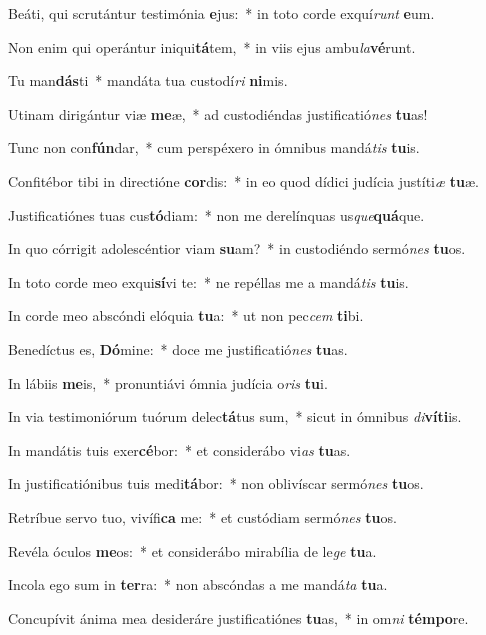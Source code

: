 \item Beáti, qui scrutántur testimónia \textbf{e}jus:~* in toto corde exquí\textit{runt} \textbf{e}um.
\item Non enim qui operántur iniqui\textbf{tá}tem,~* in viis ejus ambu\textit{la}\textbf{vé}runt.
\item Tu man\textbf{dás}ti~* mandáta tua custodí\textit{ri} \textbf{ni}mis.
\item Utinam dirigántur viæ \textbf{me}æ,~* ad custodiéndas justificatió\textit{nes} \textbf{tu}as!
\item Tunc non con\textbf{fún}dar,~* cum perspéxero in ómnibus mandá\textit{tis} \textbf{tu}is.
\item Confitébor tibi in directióne \textbf{cor}dis:~* in eo quod dídici judícia justíti\textit{æ} \textbf{tu}æ.
\item Justificatiónes tuas cus\textbf{tó}diam:~* non me derelínquas us\textit{que}\textbf{quá}que.
\item In quo córrigit adolescéntior viam \textbf{su}am?~* in custodiéndo sermó\textit{nes} \textbf{tu}os.
\item In toto corde meo exqui\textbf{sí}vi te:~* ne repéllas me a mandá\textit{tis} \textbf{tu}is.
\item In corde meo abscóndi elóquia \textbf{tu}a:~* ut non pec\textit{cem} \textbf{ti}bi.
\item Benedíctus es, \textbf{Dó}mine:~* doce me justificatió\textit{nes} \textbf{tu}as.
\item In lábiis \textbf{me}is,~* pronuntiávi ómnia judícia o\textit{ris} \textbf{tu}i.
\item In via testimoniórum tuórum delec\textbf{tá}tus sum,~* sicut in ómnibus \textit{di}\textbf{ví}\textbf{ti}is.
\item In mandátis tuis exer\textbf{cé}bor:~* et considerábo vi\textit{as} \textbf{tu}as.
\item In justificatiónibus tuis medi\textbf{tá}bor:~* non oblivíscar sermó\textit{nes} \textbf{tu}os.
\item Retríbue servo tuo, vivífi\textbf{ca} me:~* et custódiam sermó\textit{nes} \textbf{tu}os.
\item Revéla óculos \textbf{me}os:~* et considerábo mirabília de le\textit{ge} \textbf{tu}a.
\item Incola ego sum in \textbf{ter}ra:~* non abscóndas a me mandá\textit{ta} \textbf{tu}a.
\item Concupívit ánima mea desideráre justificatiónes \textbf{tu}as,~* in om\textit{ni} \textbf{tém}\textbf{po}re.
